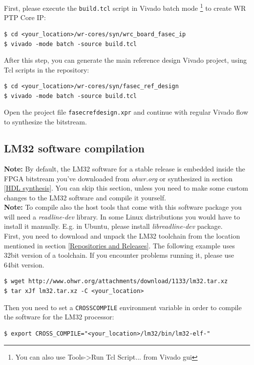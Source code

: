 \documentclass[a4paper, 12pt]{article}
\renewcommand{\_}{\underscore\allowbreak}
\begin{document}
First, please execute the \texttt{build.tcl} script in Vivado batch mode
\footnote{You can also use Tools->Run Tcl Script... from Vivado gui} to create
WR PTP Core IP:
\begin{lstlisting}
$ cd <your_location>/wr-cores/syn/wrc_board_fasec_ip
$ vivado -mode batch -source build.tcl
\end{lstlisting}

After this step, you can generate the main reference design Vivado project,
using Tcl scripts in the repository:
\begin{lstlisting}
$ cd <your_location>/wr-cores/syn/fasec_ref_design
$ vivado -mode batch -source build.tcl
\end{lstlisting}

Open the project file \texttt{fasec\_ref\_design.xpr} and continue with regular
Vivado flow to synthesize the bitstream.

\subsection{LM32 software compilation}
\label{LM32 software compilation}

\textbf{Note:} By default, the LM32 software for a stable release is embedded
inside the FPGA bitstream you've downloaded from \textit{ohwr.org} or
synthesized in section \ref{HDL synthesis}. You can skip this section, unless
you need to make some custom changes to the LM32 software and compile it
yourself.\\

\textbf{Note:} To compile also the host tools that come with this software
package you will need a \emph{readline-dev} library. In some Linux distributions
you would have to install it manually. E.g. in Ubuntu, please install
\emph{libreadline-dev} package.\\

First, you need to download and unpack the LM32 toolchain from the location
mentioned in section \ref{Repositories and Releases}. The following example
uses 32bit version of a toolchain. If you encounter problems running it, please
use 64bit version.
\begin{lstlisting}
$ wget http://www.ohwr.org/attachments/download/1133/lm32.tar.xz
$ tar xJf lm32.tar.xz -C <your_location>
\end{lstlisting}

Then you need to set a \texttt{CROSS\_COMPILE} environment variable in order
to compile the software for the LM32 processor:
\begin{lstlisting}
$ export CROSS_COMPILE="<your_location>/lm32/bin/lm32-elf-"
\end{lstlisting}
\end{document}
